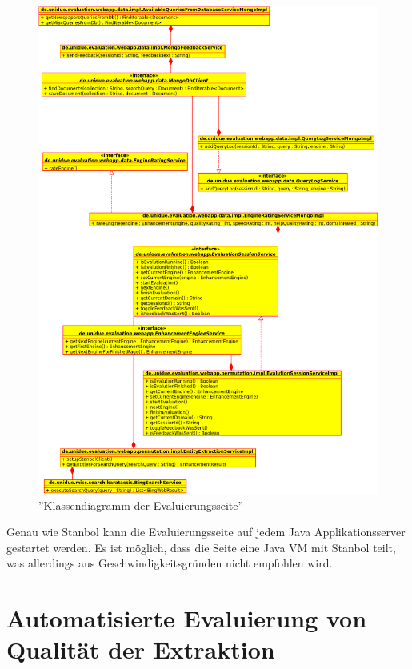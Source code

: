 \begin{figure}
\centering
\includegraphics[width=1\textwidth]{Bilder/eval_classes.png}
\caption{''Klassendiagramm der Evaluierungsseite''}
\label{fig:evalclasses}
\end{figure}

Genau wie Stanbol kann die Evaluierungsseite auf jedem Java Applikationsserver gestartet werden. Es ist möglich, dass die Seite eine Java VM mit Stanbol teilt, was allerdings aus Geschwindigkeitsgründen nicht empfohlen wird.

\section{Automatisierte Evaluierung von Qualität der Extraktion}
